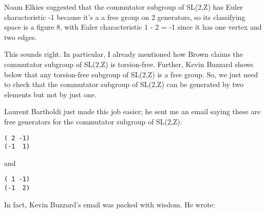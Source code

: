Noam Elkies suggested that the commutator subgroup of SL(2,Z)
has Euler characteristic -1 because it's a a free group on 2
generators, so its classifying space is a figure 8, with Euler
characteristic 1 - 2 = -1 since it has one vertex and two edges.

This sounds right.  In particular, I already mentioned how Brown
claims the commutator subgroup of SL(2,Z) is torsion-free.  Further,
Kevin Buzzard shows below that any torsion-free subgroup of SL(2,Z)
is a free group.  So, we just need to check that the commutator
subgroup of SL(2,Z) can be generated by two elements but not by just one.

Laurent Bartholdi just made this job easier;
he sent me an email saying these are free generators
for the commutator subgroup of SL(2,Z):

\begin{verbatim}
( 2 -1)
(-1  1)
\end{verbatim}
    

and

\begin{verbatim}
( 1 -1)
(-1  2)
\end{verbatim}
    

In fact, Kevin Buzzard's email was packed with wisdom.  He wrote:



